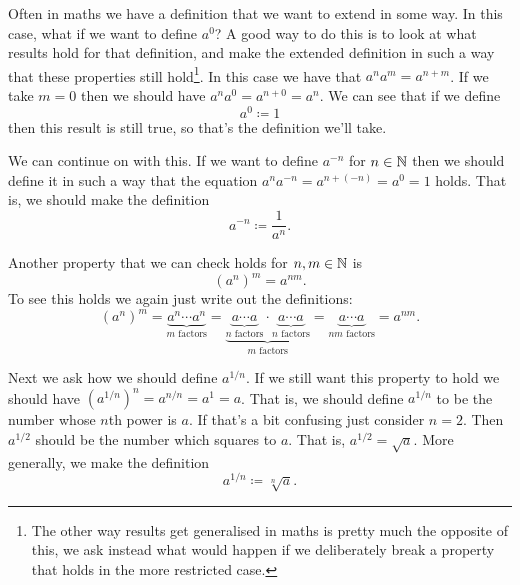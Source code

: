 \documentclass[fleqn]{LectureClass/LectureClass}
\begin{document}
    Often in maths we have a definition that we want to extend in some way.
    In this case, what if we want to define \(a^0\)?
    A good way to do this is to look at what results hold for that definition, and make the extended definition in such a way that these properties still hold\footnote{The other way results get generalised in maths is pretty much the opposite of this, we ask instead what would happen if we deliberately break a property that holds in the more restricted case.}.
    In this case we have that \(a^n a^m = a^{n + m}\).
    If we take \(m = 0\) then we should have \(a^n a^0 = a^{n + 0} = a^n\).
    We can see that if we define
    \begin{equation}
        a^0 \coloneq 1
    \end{equation} 
    then this result is still true, so that's the definition we'll take.
    
    We can continue on with this.
    If we want to define \(a^{-n}\) for \(n \in \mathbb{N}\) then we should define it in such a way that the equation \(a^n a^{-n} = a^{n + (-n)} = a^0 = 1\) holds.
    That is, we should make the definition
    \begin{equation}
        a^{-n} \coloneq \frac{1}{a^n}.
    \end{equation}
    
    Another property that we can check holds for \(n, m \in \mathbb{N}\) is
    \begin{equation}
        (a^n)^m = a^{nm}.
    \end{equation}
    To see this holds we again just write out the definitions:
    \begin{equation}
        (a^n)^m = \underbrace{a^n \dotsm a^n}_{m \text{ factors}} = \underbrace{\underbrace{a \dotsm a}_{n \text{ factors}} \cdot \underbrace{a \dotsm a}_{n \text{ factors}}}_{m \text{ factors}} = \underbrace{a \dotsm a}_{nm \text{ factors}} = a^{nm}.
    \end{equation}
    
    Next we ask how we should define \(a^{1/n}\).
    If we still want this property to hold we should have \((a^{1/n})^n = a^{n/n} = a^1 = a\).
    That is, we should define \(a^{1/n}\) to be the number whose \(n\)th power is \(a\).
    If that's a bit confusing just consider \(n = 2\).
    Then \(a^{1/2}\) should be the number which squares to \(a\).
    That is, \(a^{1/2} = \sqrt{a}\).
    More generally, we make the definition
    \begin{equation}
        a^{1/n} \coloneq \sqrt[n]{a}.
    \end{equation}
    
\end{document}
